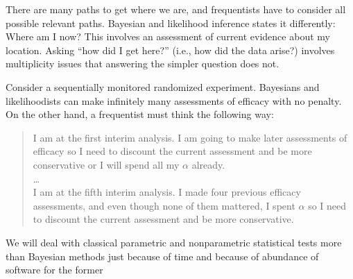    There are many paths to get where we are, and frequentists have to
   consider all possible relevant paths.  Bayesian and likelihood
   inference states it differently: Where am I now?  This involves an
   assessment of current evidence about my location.  Asking ``how did
   I get here?'' (i.e., how did the data arise?) involves multiplicity
   issues that answering the simpler question does not. 
\item Consider a sequentially monitored randomized experiment.
  Bayesians and likelihoodists can make infinitely many assessments of
  efficacy with no penalty.  On the other hand, a frequentist must
  think the following way:
  \begin{quote}
    I am at the first interim analysis.  I am going to make later
    assessments of efficacy so I need to discount the current
    assessment and be more conservative or I will spend all my
    $\alpha$ already.\\
    \ldots\\
    I am at the fifth interim analysis.  I made four previous efficacy
    assessments, and even though none of them mattered, I spent
    $\alpha$ so I need to discount the current assessment and be more
    conservative.
 \end{quote}
 \ei
\item We will deal with classical parametric and nonparametric
  statistical tests more than Bayesian methods just because of time
  and because of abundance of software for the former
\ei

